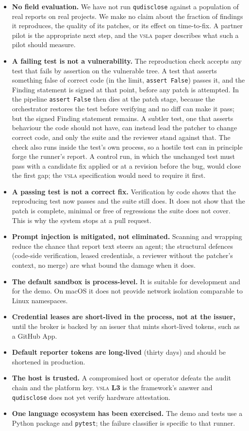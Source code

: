 \documentclass[11pt]{article}
\newcommand{\qud}{\texttt{qudisclose}}
\newcommand{\vsla}{\textsc{vsla}}
\newcommand{\lvl}[1]{\textbf{L#1}}
\newcommand{\code}[1]{\texttt{\small #1}}
\begin{document}
\begin{itemize}[leftmargin=1.4em, itemsep=0.3em]
  \item \textbf{No field evaluation.} We have not run \qud{} against a population of real reports on real
  projects. We make no claim about the fraction of findings it reproduces, the quality of its patches, or its
  effect on time-to-fix. A partner pilot is the appropriate next step, and the \vsla{} paper describes what
  such a pilot should measure.
  \item \textbf{A failing test is not a vulnerability.} The reproduction check accepts any test that fails by
  assertion on the vulnerable tree. A test that asserts something false of correct code (in the limit,
  \code{assert False}) passes it, and the Finding statement is signed at that point, before any patch is
  attempted. In the pipeline \code{assert False} then dies at the patch stage, because the orchestrator restores
  the test before verifying and no diff can make it pass; but the signed Finding statement remains. A subtler
  test, one that asserts behaviour the code should not have, can instead lead the patcher to change correct
  code, and only the suite and the reviewer stand against that. The check also runs inside the test's
  own process, so a hostile test can in principle forge the runner's report. A control run, in which the
  unchanged test must pass with a candidate fix applied or at a revision before the bug, would close the first
  gap; the \vsla{} specification would need to require it first.
  \item \textbf{A passing test is not a correct fix.} Verification by code shows that the reproducing test now
  passes and the suite still does. It does not show that the patch is complete, minimal or free of regressions
  the suite does not cover. This is why the system stops at a pull request.
  \item \textbf{Prompt injection is mitigated, not eliminated.} Scanning and wrapping reduce the chance that
  report text steers an agent; the structural defences (code-side verification, leased credentials, a reviewer
  without the patcher's context, no merge) are what bound the damage when it does.
  \item \textbf{The default sandbox is process-level.} It is suitable for development and for the demo. On
  macOS it does not provide network isolation comparable to Linux namespaces.
  \item \textbf{Credential leases are short-lived in the process, not at the issuer,} until the broker is backed
  by an issuer that mints short-lived tokens, such as a GitHub App.
  \item \textbf{Default reporter tokens are long-lived} (thirty days) and should be shortened in production.
  \item \textbf{The host is trusted.} A compromised host or operator defeats the audit chain and the platform
  key. \vsla{} \lvl{3} is the framework's answer and \qud{} does not yet verify hardware attestation.
  \item \textbf{One language ecosystem has been exercised.} The demo and tests use a Python package and
  \code{pytest}; the failure classifier is specific to that runner.
\end{itemize}
\end{document}
